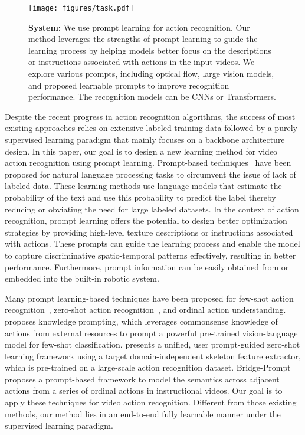\documentclass[letterpaper, 10 pt, conference]{ieeeconf}
\begin{document}
\begin{figure*}[t]
    \centering
    \texttt{[image: figures/task.pdf]}
    \caption{{\bf System:} We use prompt learning for action recognition. Our method leverages the strengths of prompt learning to guide the learning process by helping models better focus on the descriptions or instructions associated with actions in the input videos. We explore various prompts, including optical flow, large vision models, and proposed learnable prompts to improve recognition performance. The recognition models can be CNNs or Transformers.}
    \label{fig:task} 
\end{figure*}

Despite the recent progress in action recognition algorithms, the success of most existing approaches relies on extensive labeled training data followed by a purely supervised learning paradigm that mainly focuses on a backbone architecture design. In this paper, our goal is to design a new learning method for video action recognition using prompt learning. Prompt-based techniques~\cite{liu2023pre} have been proposed for natural language processing tasks to circumvent the issue of lack of labeled data. These learning methods use language models that estimate the probability of the text and use this probability to predict the label thereby reducing or obviating the need for large labeled datasets. In the context of action recognition, prompt learning offers the potential to design better optimization strategies by providing high-level texture descriptions or instructions associated with actions. These prompts can guide the learning process and enable the model to capture discriminative spatio-temporal patterns effectively, resulting in better performance. Furthermore, prompt information can be easily obtained from or embedded into the built-in robotic system.

Many prompt learning-based techniques have been proposed for few-shot action recognition~\cite{shi2022knowledge}, zero-shot action recognition~\cite{sato2023prompt,wang2021actionclip}, and ordinal action understanding. \cite{shi2022knowledge} proposes knowledge prompting, which leverages commonsense knowledge of actions from external resources to prompt a powerful pre-trained vision-language model for few-shot classification. \cite{sato2023prompt} presents a unified, user prompt-guided zero-shot learning framework using a target domain-independent skeleton feature extractor, which is pre-trained on a large-scale action recognition dataset.
Bridge-Prompt~\cite{li2022bridge} proposes a prompt-based framework to model the semantics across adjacent actions from a series of ordinal actions in instructional videos.  Our goal is to apply these techniques for video action recognition. Different from those existing methods, our method lies in an end-to-end fully learnable manner under the supervised learning paradigm.
\end{document}
